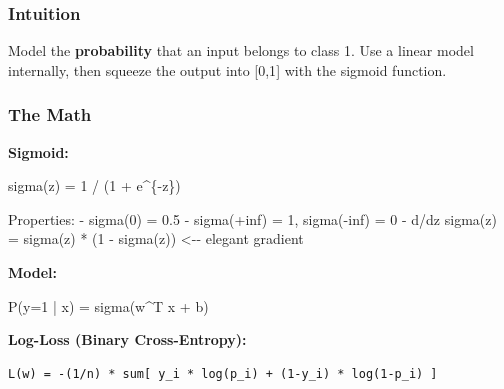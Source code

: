 \documentclass[11pt]{article}
\newenvironment{Shaded}{\begin{snugshade}}{\end{snugshade}}
\newcommand{\DecValTok}[1]{\textcolor[rgb]{0.96,0.45,0.00}{#1}}
\newcommand{\FloatTok}[1]{\textcolor[rgb]{0.96,0.45,0.00}{#1}}
\newcommand{\NormalTok}[1]{\textcolor[rgb]{0.81,0.81,0.76}{#1}}
\newcommand{\OperatorTok}[1]{\textcolor[rgb]{0.81,0.81,0.76}{#1}}
\begin{document}
\subsubsection{Intuition}\label{intuition-1}

Model the \textbf{probability} that an input belongs to class 1. Use a linear model internally, then squeeze the output into {[}0,1{]} with the sigmoid function.

\subsubsection{The Math}\label{the-math-1}

\textbf{Sigmoid:}


\begin{Shaded}
\begin{Highlighting}[]
\NormalTok{sigma(z) }\OperatorTok{=} \DecValTok{1} \OperatorTok{/}\NormalTok{ (}\DecValTok{1} \OperatorTok{+}\NormalTok{ e}\OperatorTok{\^{}}\NormalTok{\{}\OperatorTok{{-}}\NormalTok{z\})}

\NormalTok{Properties:}
\OperatorTok{{-}}\NormalTok{ sigma(}\DecValTok{0}\NormalTok{) }\OperatorTok{=} \FloatTok{0.5}
\OperatorTok{{-}}\NormalTok{ sigma(}\OperatorTok{+}\NormalTok{inf) }\OperatorTok{=} \DecValTok{1}\NormalTok{, sigma(}\OperatorTok{{-}}\NormalTok{inf) }\OperatorTok{=} \DecValTok{0}
\OperatorTok{{-}}\NormalTok{ d}\OperatorTok{/}\NormalTok{dz sigma(z) }\OperatorTok{=}\NormalTok{ sigma(z) }\OperatorTok{*}\NormalTok{ (}\DecValTok{1} \OperatorTok{{-}}\NormalTok{ sigma(z))   }\OperatorTok{\textless{}{-}{-}}\NormalTok{ elegant gradient}
\end{Highlighting}
\end{Shaded}

\textbf{Model:}


\begin{Shaded}
\begin{Highlighting}[]
\NormalTok{P(y}\OperatorTok{=}\DecValTok{1} \OperatorTok{|}\NormalTok{ x) }\OperatorTok{=}\NormalTok{ sigma(w}\OperatorTok{\^{}}\NormalTok{T x }\OperatorTok{+}\NormalTok{ b)}
\end{Highlighting}
\end{Shaded}

\textbf{Log-Loss (Binary Cross-Entropy):}

\setcodelang{}

\begin{verbatim}
L(w) = -(1/n) * sum[ y_i * log(p_i) + (1-y_i) * log(1-p_i) ]
\end{verbatim}
\end{document}
